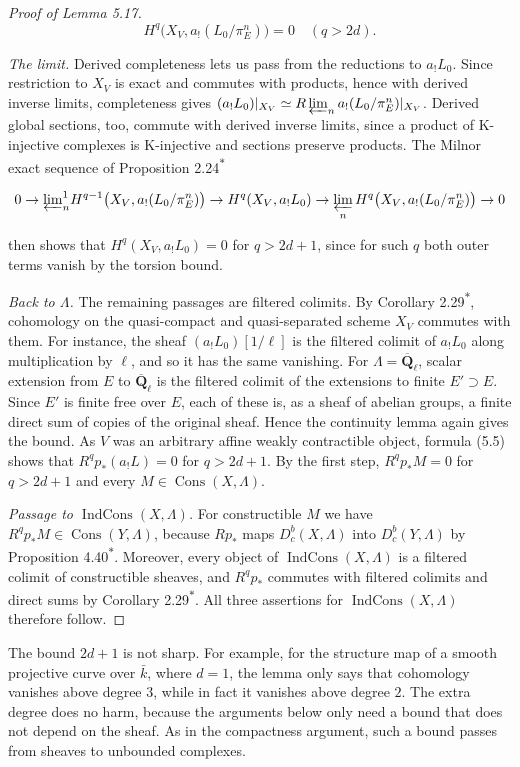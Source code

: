 \documentclass[11pt]{article}
\newcommand{\bpout}[1]{#1\textsuperscript{\hyperlink{bp-outside}{\ensuremath{\ast}}}}
\providecommand{\Cons}{}\renewcommand{\Cons}{\operatorname{Cons}}
\providecommand{\Dbc}{}\renewcommand{\Dbc}{D^b_c}
\providecommand{\IndCons}{}\renewcommand{\IndCons}{\operatorname{IndCons}}
\begin{document}
\begin{proof}[{Proof of Lemma 5.17}]
\[
H^q\bigl(X_V,a_!(L_0/\pi_E^n)\bigr)=0\quad(q>2d).
\]

\emph{The limit.} Derived completeness lets us pass from the reductions to \(a_!L_0\). Since restriction to \(X_V\) is exact and commutes with products, hence with derived inverse limits, completeness gives \((a_!L_0)|_{X_V}\simeq R\varprojlim_n a_!(L_0/\pi_E^n)|_{X_V}\). Derived global sections, too, commute with derived inverse limits, since a product of K-injective complexes is K-injective and sections preserve products. The Milnor exact sequence of Proposition \bpout{2.24}

\[
0\to{\textstyle\varprojlim^1_n}H^{q-1}\bigl(X_V,a_!(L_0/\pi_E^n)\bigr)
\to H^q(X_V,a_!L_0)
\to\varprojlim_nH^q\bigl(X_V,a_!(L_0/\pi_E^n)\bigr)\to0
\]

then shows that \(H^q(X_V,a_!L_0)=0\) for \(q>2d+1\), since for such \(q\) both outer terms vanish by the torsion bound.

\emph{Back to \(\Lambda\).} The remaining passages are filtered colimits. By Corollary \bpout{2.29}, cohomology on the quasi-compact and quasi-separated scheme \(X_V\) commutes with them. For instance, the sheaf \((a_!L_0)[1/\ell]\) is the filtered colimit of \(a_!L_0\) along multiplication by \(\ell\), and so it has the same vanishing. For \(\Lambda=\overline{\mathbf Q}_\ell\), scalar extension from \(E\) to \(\overline{\mathbf Q}_\ell\) is the filtered colimit of the extensions to finite \(E'\supset E\). Since \(E'\) is finite free over \(E\), each of these is, as a sheaf of abelian groups, a finite direct sum of copies of the original sheaf. Hence the continuity lemma again gives the bound. As \(V\) was an arbitrary affine weakly contractible object, formula (5.5) shows that \(R^qp_*(a_!L)=0\) for \(q>2d+1\). By the first step, \(R^qp_*M=0\) for \(q>2d+1\) and every \(M\in\Cons(X,\Lambda)\).

\emph{Passage to \(\IndCons(X,\Lambda)\).} For constructible \(M\) we have \(R^qp_*M\in\Cons(Y,\Lambda)\), because \(Rp_*\) maps \(\Dbc(X,\Lambda)\) into \(\Dbc(Y,\Lambda)\) by Proposition \bpout{4.40}. Moreover, every object of \(\IndCons(X,\Lambda)\) is a filtered colimit of constructible sheaves, and \(R^qp_*\) commutes with filtered colimits and direct sums by Corollary \bpout{2.29}. All three assertions for \(\IndCons(X,\Lambda)\) therefore follow.
\end{proof}

\label{bp60}%
The bound \(2d+1\) is not sharp. For example, for the structure map of a smooth projective curve over \(\bar k\), where \(d=1\), the lemma only says that cohomology vanishes above degree \(3\), while in fact it vanishes above degree \(2\). The extra degree does no harm, because the arguments below only need a bound that does not depend on the sheaf. As in the compactness argument, such a bound passes from sheaves to unbounded complexes.
\end{document}
